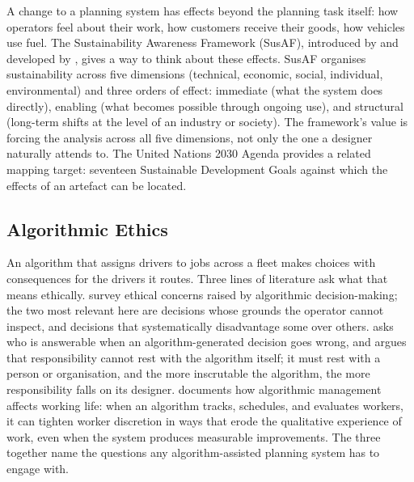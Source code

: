 A change to a planning system has effects beyond the planning task itself: how operators feel about their work, how customers receive their goods, how vehicles use fuel. The Sustainability Awareness Framework (SusAF), introduced by \textcite{becker2015karlskrona} and developed by \textcite{duboc2020requirements}, gives a way to think about these effects. SusAF organises sustainability across five dimensions (technical, economic, social, individual, environmental) and three orders of effect: immediate (what the system does directly), enabling (what becomes possible through ongoing use), and structural (long-term shifts at the level of an industry or society). The framework's value is forcing the analysis across all five dimensions, not only the one a designer naturally attends to. The United Nations 2030 Agenda \parencite{un2015agenda2030} provides a related mapping target: seventeen Sustainable Development Goals against which the effects of an artefact can be located.

\subsection{Algorithmic Ethics}
\label{sec:algo-ethics}

An algorithm that assigns drivers to jobs across a fleet makes choices with consequences for the drivers it routes. Three lines of literature ask what that means ethically. \textcite{mittelstadt2016algorithms} survey ethical concerns raised by algorithmic decision-making; the two most relevant here are decisions whose grounds the operator cannot inspect, and decisions that systematically disadvantage some over others. \textcite{martin2019accountability} asks who is answerable when an algorithm-generated decision goes wrong, and argues that responsibility cannot rest with the algorithm itself; it must rest with a person or organisation, and the more inscrutable the algorithm, the more responsibility falls on its designer. \textcite{lee2018understanding} documents how algorithmic management affects working life: when an algorithm tracks, schedules, and evaluates workers, it can tighten worker discretion in ways that erode the qualitative experience of work, even when the system produces measurable improvements. The three together name the questions any algorithm-assisted planning system has to engage with.
